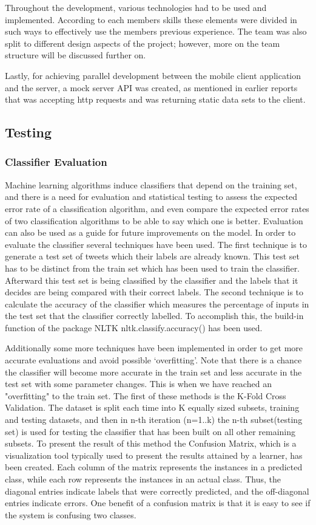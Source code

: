 Throughout the development, various technologies had to be used and implemented. According to each 
members skills these elements were divided in such ways to effectively use the members previous 
experience. The team was also split to different design aspects of the project; however, more on the 
team structure will be discussed further on.

Lastly, for achieving parallel development between 
the mobile client application and the server, a mock server API was created, as mentioned in earlier 
reports that was accepting http requests and was returning static data sets to the client. 

\subsection{Testing} 
\subsubsection{Classifier Evaluation} 
Machine learning algorithms induce classifiers that depend on the training set, and there is a need for evaluation and statistical testing to assess the expected error rate of a classification algorithm, and even compare the expected error rates of two classification algorithms to be able to say which one is better. Evaluation can also be used as a guide for future improvements on the model. In order to evaluate the classifier several techniques have been used. The first technique is to generate a test set of tweets which their labels are already known. This test set has to be distinct from the train set which has been used to train the classifier. Afterward this test set is being classified by the classifier and the labels that it decides are being compared with their correct labels. The second technique is to calculate the accuracy of the classifier which measures the percentage of inputs in the test set that the classifier correctly labelled. To accomplish this, the build-in function of the package NLTK nltk.classify.accuracy() has been used.

Additionally some more techniques have been implemented in order to get more
accurate evaluations and avoid possible `overfitting'. Note that there is a chance the classifier will become more accurate in the train set and less accurate in the test set with some parameter changes. This is when we have reached an "overfitting" to the train set. The first of these methods is the K-Fold Cross Validation. The dataset is split each time into K equally sized subsets, training and testing datasets, and then in n-th iteration (n=1..k) the n-th subset(testing set) is used for testing the classifier that has been built on all other remaining subsets. To present the result of this method the Confusion Matrix, which is a visualization tool typically used to present the results attained by a learner, has been created. Each column of the matrix represents the instances in a predicted class, while each row represents the instances in an actual class. Thus, the diagonal entries indicate labels that were correctly predicted, and the off-diagonal entries indicate errors. One benefit of a confusion matrix is that it is easy to see if the system is confusing two classes.

